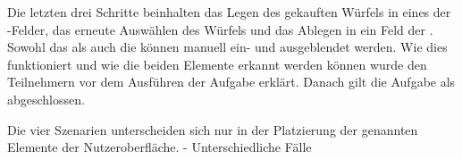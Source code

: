 			Die letzten drei Schritte beinhalten das Legen des gekauften Würfels in eines der -Felder, das erneute Auswählen des Würfels und das Ablegen in ein Feld der . Sowohl das  als auch die  können manuell ein- und ausgeblendet werden. Wie dies funktioniert und wie die beiden Elemente erkannt werden können wurde den Teilnehmern vor dem Ausführen der Aufgabe erklärt.
			Danach gilt die Aufgabe als abgeschlossen.
			
			Die vier Szenarien unterscheiden sich nur in der Platzierung der genannten Elemente der Nutzeroberfläche.
			- Unterschiedliche Fälle
		